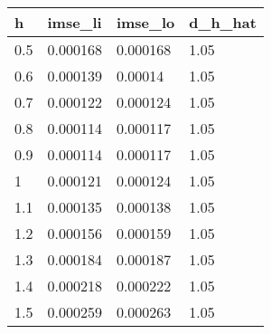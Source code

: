 \begin{tabular}{llll}
  \hline
h & imse\_li & imse\_lo & d\_h\_hat \\ 
  \hline
0.5 & 0.000168 & 0.000168 & 1.05 \\ 
  0.6 & 0.000139 & 0.00014 & 1.05 \\ 
  0.7 & 0.000122 & 0.000124 & 1.05 \\ 
  0.8 & 0.000114 & 0.000117 & 1.05 \\ 
  0.9 & 0.000114 & 0.000117 & 1.05 \\ 
  1 & 0.000121 & 0.000124 & 1.05 \\ 
  1.1 & 0.000135 & 0.000138 & 1.05 \\ 
  1.2 & 0.000156 & 0.000159 & 1.05 \\ 
  1.3 & 0.000184 & 0.000187 & 1.05 \\ 
  1.4 & 0.000218 & 0.000222 & 1.05 \\ 
  1.5 & 0.000259 & 0.000263 & 1.05 \\ 
   \hline
\end{tabular}

